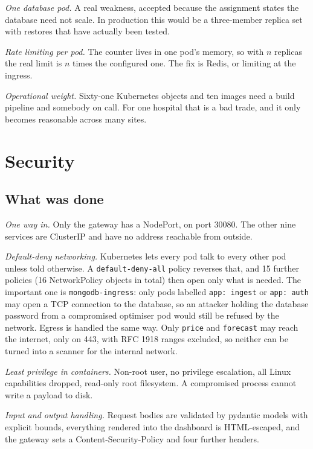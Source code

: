 \documentclass[conference]{IEEEtran}
\begin{document}
\emph{One database pod.} A real weakness, accepted because the assignment states
the database need not scale. In production this would be a three-member replica
set with restores that have actually been tested.

\emph{Rate limiting per pod.} The counter lives in one pod's memory, so with $n$
replicas the real limit is $n$ times the configured one. The fix is Redis, or
limiting at the ingress.

\emph{Operational weight.} Sixty-one Kubernetes objects and ten images need a
build pipeline and somebody on call. For one hospital that is a bad trade, and
it only becomes reasonable across many sites.

\section{Security}

\subsection{What was done}

\emph{One way in.} Only the gateway has a NodePort, on port 30080. The other nine services are
ClusterIP and have no address reachable from outside.

\emph{Default-deny networking.} Kubernetes lets every pod talk to every other
pod unless told otherwise. A \texttt{default-deny-all} policy reverses that, and
15 further policies (16 NetworkPolicy objects in total) then open only what is
needed. The important one is \texttt{mongodb-ingress}: only pods labelled
\texttt{app: ingest} or \texttt{app: auth} may open a TCP connection to the
database, so an attacker holding the database password from a compromised
optimiser pod would still be refused by the network. Egress is
handled the same way. Only \texttt{price} and \texttt{forecast} may reach the
internet, only on 443, with RFC 1918 ranges excluded, so neither can be turned
into a scanner for the internal network.

\emph{Least privilege in containers.} Non-root user, no privilege escalation,
all Linux capabilities dropped, read-only root filesystem. A compromised process
cannot write a payload to disk.

\emph{Input and output handling.} Request bodies are validated by pydantic
models with explicit bounds, everything rendered into the dashboard is
HTML-escaped, and the gateway sets a Content-Security-Policy and four further
headers.
\end{document}
